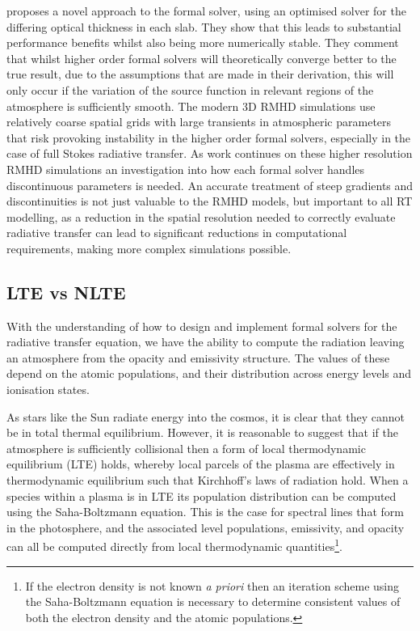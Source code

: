 \citet{Janett2018} proposes a novel approach to the formal solver,  using an optimised solver for the differing optical thickness in each slab. They show that this leads to substantial performance benefits whilst also being more numerically stable. They comment that whilst higher order formal solvers will theoretically converge better to the true result, due to the assumptions that are made in their derivation, this will only occur if the variation of the source function in relevant regions of the atmosphere is sufficiently smooth. The modern 3D RMHD simulations use relatively coarse spatial grids with large transients in atmospheric parameters that risk provoking instability in the higher order formal solvers, especially in the case of full Stokes radiative transfer.
As work continues on these higher resolution RMHD simulations an investigation into how each formal solver handles discontinuous parameters is needed.
An accurate treatment of steep gradients and discontinuities is not just valuable to the RMHD models, but important to all RT modelling, as a reduction in the spatial resolution needed to correctly evaluate radiative transfer can lead to significant reductions in computational requirements, making more complex simulations possible.


\subsection{LTE vs NLTE}

With the understanding of how to design and implement formal solvers for the radiative transfer equation, we have the ability to compute the radiation leaving an atmosphere from the opacity and emissivity structure.
The values of these depend on the atomic populations, and their distribution across energy levels and ionisation states.

As stars like the Sun radiate energy into the cosmos, it is clear that they cannot be in total thermal equilibrium.
However, it is reasonable to suggest that if the atmosphere is sufficiently collisional then a form of local thermodynamic equilibrium (LTE) holds, whereby local parcels of the plasma are effectively in thermodynamic equilibrium such that Kirchhoff's laws of radiation hold.
When a species within a plasma is in LTE its population distribution can be computed using the Saha-Boltzmann equation.
This is the case for spectral lines that form in the photosphere, and the associated level populations, emissivity, and opacity can all be computed directly from local thermodynamic quantities\footnote{If the electron density is not known \textit{a priori} then an iteration scheme using the Saha-Boltzmann equation is necessary to determine consistent values of both the electron density and the atomic populations.}.

